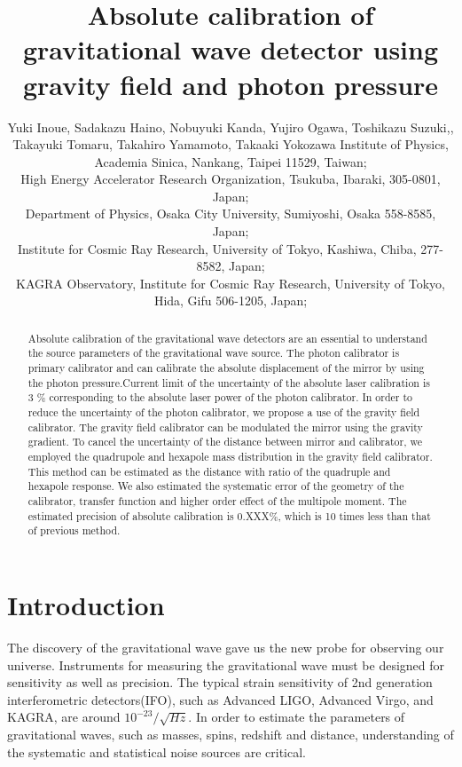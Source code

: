 \documentclass[A4]{spie}  %
\title{Absolute calibration of gravitational wave detector using gravity field and photon pressure}
\author{Yuki Inoue\supit{a,b}, Sadakazu Haino\supit{a}, Nobuyuki Kanda\supit{c}, Yujiro Ogawa\supit{b}, Toshikazu Suzuki,\supit{d}, Takayuki Tomaru\supit{b}, Takahiro Yamamoto\supit{e}, Takaaki Yokozawa\supit{e}
\skiplinehalf
\supit{a}Institute of Physics, Academia Sinica, Nankang, Taipei 11529, Taiwan; \\
\supit{b}High Energy Accelerator Research Organization, Tsukuba, Ibaraki, 305-0801, Japan;\\
\supit{c}Department of Physics, Osaka City University, Sumiyoshi, Osaka 558-8585, Japan;\\
\supit{d}Institute for Cosmic Ray Research, University of Tokyo, Kashiwa, Chiba, 277-8582, Japan;\\
\supit{e}KAGRA Observatory, Institute for Cosmic Ray Research, University of Tokyo, Hida, Gifu 506-1205, Japan;\\
}
\begin{document}
 
  \maketitle 

\begin{abstract}
Absolute calibration of the gravitational wave detectors are an essential to understand the source parameters of the gravitational wave source. The photon calibrator is primary calibrator and can calibrate the absolute displacement of the mirror by using the photon pressure.Current limit of the uncertainty of the absolute laser calibration is 3 \% corresponding to the absolute laser power of the photon calibrator.  In order to reduce the uncertainty of the photon calibrator, we propose a use of the gravity field calibrator. The gravity field calibrator can be modulated the mirror using the gravity gradient. To cancel the uncertainty of the distance between mirror and calibrator, we employed the quadrupole and hexapole mass distribution in the gravity field calibrator. This method can be estimated as the distance with ratio of the quadruple and hexapole response. We also estimated the systematic error of the geometry of the calibrator, transfer function and higher order effect of the multipole moment. The estimated precision of absolute calibration is 0.XXX\%, which is 10 times less than that of previous method.

\end{abstract}



\section{Introduction}

The discovery of the gravitational wave gave us the new probe for observing our universe. 
Instruments for measuring the gravitational wave must be designed for sensitivity as well as precision.
The typical strain sensitivity of 2nd generation interferometric detectors(IFO), such as Advanced LIGO, Advanced Virgo, and KAGRA, are around $10^{-23}/\sqrt{Hz}$. In order to estimate the parameters of gravitational waves, such as masses, spins, redshift and distance, understanding of the systematic and statistical noise sources are critical.
\end{document}
